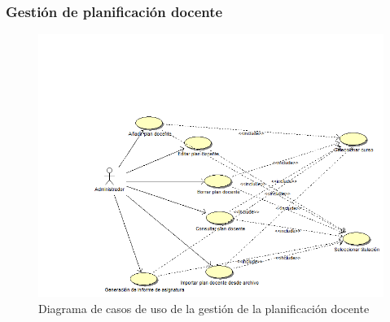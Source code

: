 \documentclass{book}
\begin{document}
\subsubsection{Gestión de planificación docente}
\begin{figure}[H] 
  \label{gestion-planificacion} 
	\begin{center}
    \includegraphics[scale=0.5]{./gestionplanificacion.png}
  \end{center}
\caption{Diagrama de casos de uso de la gestión de la planificación docente}
\end{figure}
\end{document}
